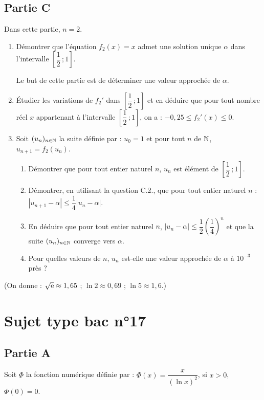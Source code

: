 \subsection*{Partie C}

Dans cette partie, $n=2$.

\begin{enumerate}
	\item Démontrer que l'équation $f_2(x)=x$ admet une solution unique $\alpha$ dans l'intervalle $\left[\dfrac12\,;1\right]$.

	Le but de cette partie est de déterminer une valeur approchée de $\alpha$.
	\item Étudier les variations de $f_2'$ dans $\left[\dfrac12\,;1\right]$ et en déduire que pour tout nombre réel $x$ appartenant à l'intervalle $\left[\dfrac12\,;1\right]$, on a : $-0,25\leqslant f_2'(x)\leqslant0$.
	\item Soit $(u_n)_{n\in\mathbb{N}}$ la suite définie par : $u_0=1$ et pour tout $n$ de $\mathbb{N}$, $u_{n+1}=f_2(u_n)$.
	\begin{enumerate}
		\item Démontrer que pour tout entier naturel $n$, $u_n$ est élément de $\left[\dfrac12\,;1\right]$.
		\item Démontrer, en utilisant la question C.2., que pour tout entier naturel $n$ : $|u_{n+1}-\alpha|\leqslant\dfrac14|u_n-\alpha|$.
		\item En déduire que pour tout entier naturel $n$, $|u_n-\alpha|\leqslant\dfrac12\left(\dfrac14\right)^n$ et que la suite $(u_n)_{n\in\mathbb{N}}$ converge vers $\alpha$.
		\item Pour quelles valeurs de $n$, $u_n$ est-elle une valeur approchée de $\alpha$ à $10^{-3}$ près ?
	\end{enumerate}
\end{enumerate}

(On donne : $\sqrt{\mathrm{e}}\approx1,65$ ; $\ln2\approx0,69$ ; $\ln5\approx1,6$.)


\section*{Sujet type bac n°17}

\subsection*{Partie A}

Soit $\Phi$ la fonction numérique définie par : $\Phi(x)=\dfrac{x}{(\ln x)^2}$, si $x>0$, $\Phi(0)=0$.

